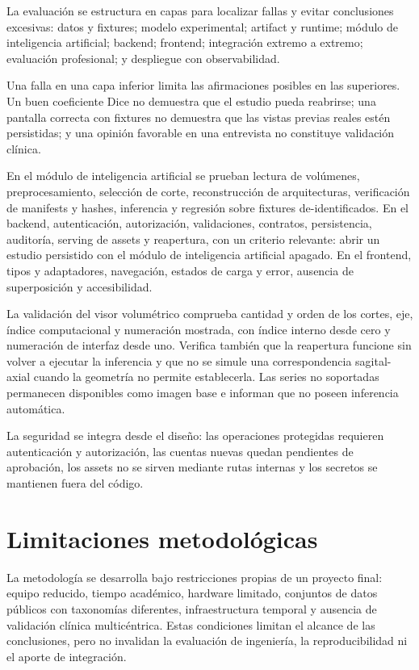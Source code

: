 La evaluación se estructura en capas para localizar fallas y evitar conclusiones excesivas: datos y fixtures; modelo experimental; artifact y runtime; módulo de inteligencia artificial; backend; frontend; integración extremo a extremo; evaluación profesional; y despliegue con observabilidad.

Una falla en una capa inferior limita las afirmaciones posibles en las superiores. Un buen coeficiente Dice no demuestra que el estudio pueda reabrirse; una pantalla correcta con fixtures no demuestra que las vistas previas reales estén persistidas; y una opinión favorable en una entrevista no constituye validación clínica.

En el módulo de inteligencia artificial se prueban lectura de volúmenes, preprocesamiento, selección de corte, reconstrucción de arquitecturas, verificación de manifests y hashes, inferencia y regresión sobre fixtures de-identificados. En el backend, autenticación, autorización, validaciones, contratos, persistencia, auditoría, serving de assets y reapertura, con un criterio relevante: abrir un estudio persistido con el módulo de inteligencia artificial apagado. En el frontend, tipos y adaptadores, navegación, estados de carga y error, ausencia de superposición y accesibilidad.

La validación del visor volumétrico comprueba cantidad y orden de los cortes, eje, índice computacional y numeración mostrada, con índice interno desde cero y numeración de interfaz desde uno. Verifica también que la reapertura funcione sin volver a ejecutar la inferencia y que no se simule una correspondencia sagital-axial cuando la geometría no permite establecerla. Las series no soportadas permanecen disponibles como imagen base e informan que no poseen inferencia automática.

La seguridad se integra desde el diseño: las operaciones protegidas requieren autenticación y autorización, las cuentas nuevas quedan pendientes de aprobación, los assets no se sirven mediante rutas internas y los secretos se mantienen fuera del código.

\section{Limitaciones metodológicas}

La metodología se desarrolla bajo restricciones propias de un proyecto final: equipo reducido, tiempo académico, hardware limitado, conjuntos de datos públicos con taxonomías diferentes, infraestructura temporal y ausencia de validación clínica multicéntrica. Estas condiciones limitan el alcance de las conclusiones, pero no invalidan la evaluación de ingeniería, la reproducibilidad ni el aporte de integración.

